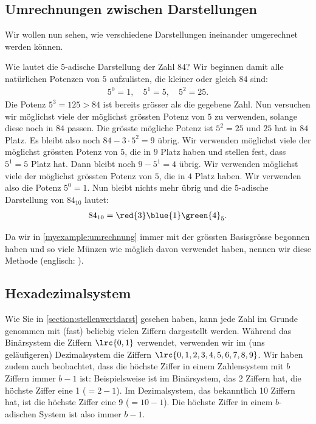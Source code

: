 \subsection{Umrechnungen zwischen Darstellungen}
Wir wollen nun sehen, wie verschiedene Darstellungen ineinander umgerechnet werden können.
\begin{myexample}\label{myexample:umrechnung}
Wie lautet die $5$-adische Darstellung der Zahl $84$? Wir beginnen damit alle natürlichen Potenzen von $5$
aufzulisten, die kleiner oder gleich $84$ sind:
\begin{align*}
	5^0 = 1, \quad 5^1 = 5, \quad 5^2 = 25.
\end{align*}
Die Potenz $5^3 = 125 > 84$ ist bereits grösser als die gegebene Zahl. Nun versuchen wir möglichst viele der möglichst
grössten Potenz von $5$ zu verwenden, solange diese noch in $84$ passen. Die grösste mögliche Potenz ist $5^2 = 25$ und
$25$ hat  in $84$ Platz. Es bleibt also noch $84-3\cdot 5^2 = 9$ übrig. Wir verwenden möglichst viele der
möglichst grössten Potenz von $5$, die in $9$ Platz haben und stellen fest, dass $5^1=5$  Platz hat. Dann
bleibt noch $9-5^1 = 4$ übrig. Wir verwenden möglichst viele der möglichst grössten Potenz von $5$, die in $4$ Platz
haben. Wir verwenden also  die Potenz $5^0 = 1$. Nun bleibt nichts mehr übrig und die $5$-adische
Darstellung von $84_{10}$ lautet:
\begin{align*}
	84_{10} = \red{3}\blue{1}\green{4}_5.
\end{align*}
\end{myexample}
Da wir in \cref{myexample:umrechnung} immer mit der grössten Basisgrösse begonnen haben und so viele Münzen wie möglich
davon verwendet haben, nennen wir diese Methode  (englisch: ).

\subsection{Hexadezimalsystem}
Wie Sie in \cref{section:stellenwertdarst} gesehen haben, kann jede Zahl im Grunde genommen mit (fast) beliebig vielen Ziffern dargestellt werden. Während das Binärsystem die Ziffern $\lrc{0,1}$ verwendet, verwenden wir im (uns geläufigeren) Dezimalsystem die Ziffern $\lrc{0,1,2,3,4,5,6,7,8,9}$. Wir haben zudem auch beobachtet, dass die höchste Ziffer in einem Zahlensystem mit $b$ Ziffern immer $b-1$ ist: Beispielsweise ist im Binärsystem, das 2 Ziffern hat, die höchste Ziffer eine 1 ($= 2-1$). Im Dezimalsystem, das bekanntlich 10 Ziffern hat, ist die höchste Ziffer eine 9 ($ = 10-1$). Die höchste Ziffer in einem $b$-adischen System ist also immer $b-1$.

